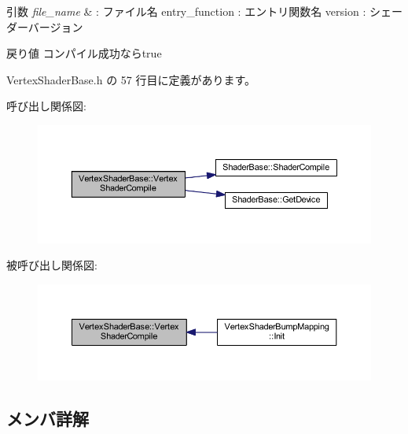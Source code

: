 \begin{DoxyParams}{引数}
{\em file\+\_\+name} & \+: ファイル名 entry\+\_\+function \+: エントリ関数名 version \+: シェーダーバージョン \\
\hline
\end{DoxyParams}
\begin{DoxyReturn}{戻り値}
コンパイル成功ならtrue 
\end{DoxyReturn}


 Vertex\+Shader\+Base.\+h の 57 行目に定義があります。

呼び出し関係図\+:\nopagebreak
\begin{figure}[H]
\begin{center}
\leavevmode
\includegraphics[width=350pt]{class_vertex_shader_base_a6565abadb8ac173d3273ab1698d31c6c_cgraph}
\end{center}
\end{figure}
被呼び出し関係図\+:\nopagebreak
\begin{figure}[H]
\begin{center}
\leavevmode
\includegraphics[width=350pt]{class_vertex_shader_base_a6565abadb8ac173d3273ab1698d31c6c_icgraph}
\end{center}
\end{figure}


\subsection{メンバ詳解}
\mbox{\label{class_vertex_shader_base_a06f34810bedce79d6115c88a61dfbea4}} 

